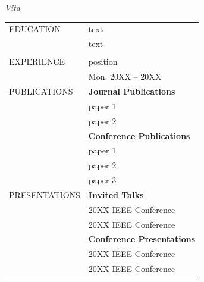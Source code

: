 \documentclass[oneside,openany]{report}
\begin{document}
\small

\pagebreak
% 
\noindent \fontsize{15bp}{10bp}\emph{Vita}\par
{}%
\vspace{5pt}
\begin{singlespace}
\begin{longtable}{p{} p{}} 
		EDUCATION    & text \\
		
		& text
		\\\\
		
		EXPERIENCE   & position\\ &\hfill Mon. 20XX -- 20XX \\

		
		PUBLICATIONS & \textbf{Journal Publications}\\

		& paper 1 \vspace{0.05in}\\
		& paper 2 \vspace{0.15in}\\


		& \textbf{Conference Publications}\\
		& paper 1 \vspace{0.05in}\\
		& paper 2 \vspace{0.05in}\\
		& paper 3 \vspace{0.15in}\\
		
		PRESENTATIONS
		& \textbf{Invited Talks}\\
		& 20XX IEEE Conference \vspace{0.05in}\\
		& 20XX IEEE Conference
		\vspace{0.15in}\\
		
		& \textbf{Conference Presentations}\\
		& 20XX IEEE Conference \vspace{0.05in}\\
		& 20XX IEEE Conference
		\vspace{0.15in}\\
		

\end{longtable}
\end{singlespace}
\end{document}

